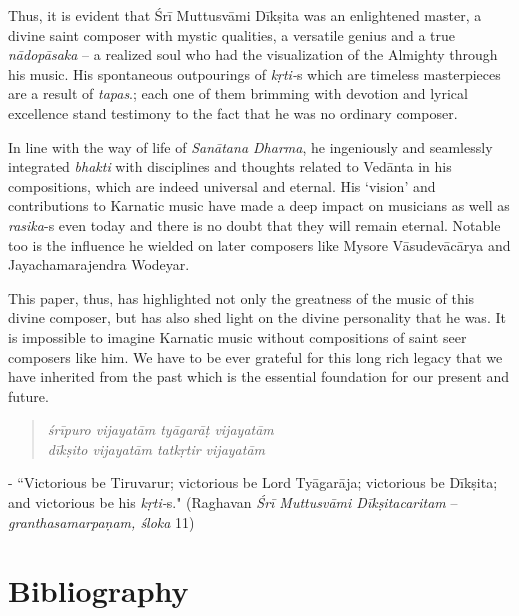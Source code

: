 Thus, it is evident that Śrī Muttusvāmi Dīkṣita was an enlightened master, a divine saint composer with mystic qualities, a versatile genius and a true \textit{nādopāsaka} – a realized soul who had the visualization of the Almighty through his music. His spontaneous outpourings of \textit{kṛti-}s which are timeless masterpieces are a result of \textit{tapas}.; each one of them brimming with devotion and lyrical excellence stand testimony to the fact that he was no ordinary composer.

In line with the way of life of \textit{Sanātana Dharma}, he ingeniously and seamlessly integrated \textit{bhakti} with disciplines and thoughts related to Vedānta in his compositions, which are indeed universal and eternal. His ‘vision’ and contributions to Karnatic music have made a deep impact on musicians as well as \textit{rasika}-s even today and there is no doubt that they will remain eternal. Notable too is the influence he wielded on later composers like Mysore Vāsudevācārya and Jayachamarajendra Wodeyar.

This paper, thus, has highlighted not only the greatness of the music of this divine composer, but has also shed light on the divine personality that he was. It is impossible to imagine Karnatic music without compositions of saint seer composers like him. We have to be ever grateful for this long rich legacy that we have inherited from the past which is the essential foundation for our present and future.

\vspace{-.3cm}

\begin{verse}
\textit{śrīpuro vijayatām tyāgarāṭ vijayatām} \\\textit{dīkṣito vijayatām tatkṛtir vijayatām} 
\end{verse}

\vspace{-.3cm}

- ``Victorious be Tiruvarur; victorious be Lord Tyāgarāja; victorious be Dīkṣita; and victorious be his \textit{kṛti-}s." (Raghavan \textit{Śrī Muttusvāmi Dīkṣitacaritam} – \textit{granthasamarpaṇam, śloka} 11)

\section*{Bibliography}

